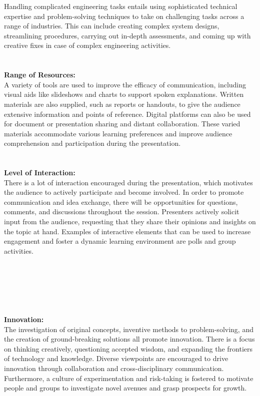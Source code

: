 \documentclass[a4paper,14pt]{report}
\begin{document}
Handling complicated engineering tasks entails using sophisticated technical expertise and problem-solving techniques to take on challenging tasks across a range of industries. This can include creating complex system designs, streamlining procedures, carrying out in-depth assessments, and coming up with creative fixes in case of complex engineering activities.
\\
\\
\\
\textbf{Range of Resources:}
\\
A variety of tools are used to improve the efficacy of communication, including visual aids like slideshows and charts to support spoken explanations. Written materials are also supplied, such as reports or handouts, to give the audience extensive information and points of reference. Digital platforms can also be used for document or presentation sharing and distant collaboration. These varied materials accommodate various learning preferences and improve audience comprehension and participation during the presentation.
\\
\\
\\
\textbf{Level of Interaction:}
\\
There is a lot of interaction encouraged during the presentation, which motivates the audience to actively participate and become involved. In order to promote communication and idea exchange, there will be opportunities for questions, comments, and discussions throughout the session. Presenters actively solicit input from the audience, requesting that they share their opinions and insights on the topic at hand. Examples of interactive elements that can be used to increase engagement and foster a dynamic learning environment are polls and group activities.
\\
\\
\\
\\
\\
\\
\\
\textbf{Innovation:}
\\
The investigation of original concepts, inventive methods to problem-solving, and the creation of ground-breaking solutions all promote innovation. There is a focus on thinking creatively, questioning accepted wisdom, and expanding the frontiers of technology and knowledge. Diverse viewpoints are encouraged to drive innovation through collaboration and cross-disciplinary communication. Furthermore, a culture of experimentation and risk-taking is fostered to motivate people and groups to investigate novel avenues and grasp prospects for growth.
\end{document}
